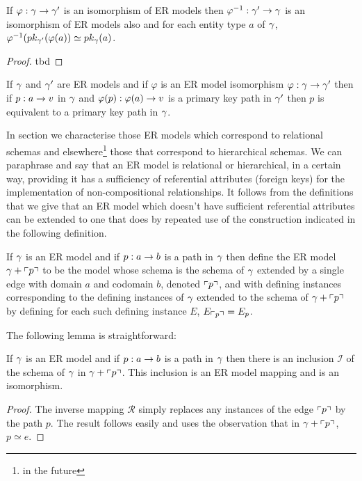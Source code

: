 \begin{lemma}
If $\varphi: \gmodel \morph \gmodel'$ is an isomorphism of ER models then
$\varphi^{-1}: \gmodel' \morph \gmodel$ is an isomorphism of ER models also and
for each entity type $a$ of $\gmodel$, $\varphi^{-1}(\pk[\gmodel']{\varphi(a)}\simeq\pk{a}$.
\end{lemma}
\begin{proof}
tbd
\end{proof}

\begin{lemma}
If $\gmodel$ and $\gmodel'$ are ER models and if $\varphi$ is an ER model isomorphism $\varphi: \gmodel \morph \gmodel'$ then if $p:a \morph \veee$ in $\gmodel$ and $\varphi(p) :\varphi(a) \morph \veee$ is a primary key path in $\gmodel'$ then $p$ is equivalent to a primary key path in $\gmodel$.
\end{lemma}

In section  we characterise those ER models which correspond to relational schemas and elsewhere\footnote{in the future} those that correspond to hierarchical schemas. 
We can paraphrase and say that an ER model is relational or hierarchical, in a certain way,  providing it has a sufficiency of referential attributes (foreign keys) for the implementation  of non-compositional relationships. It follows from the definitions that we give that an ER model which doesn't have sufficient 
referential attributes can be extended to one that does by repeated use of the construction indicated in the following definition.
\begin{definition}
If $\gmodel$ is an ER model and if $p:a \morph b$ is a path in $\gmodel$ then define the ER model $\gmodel + \qq{p}$ to be the model whose schema is the schema of $\gmodel$ extended by a single edge with domain $a$ and codomain $b$, denoted $\qq{p}$, and with defining instances corresponding to the defining instances of $\gmodel$ extended to the schema of $\gmodel + \qq{p}$ by defining for each such defining instance $E$, $E_{\qq{p}}=E_p$.
\end{definition} 


The following lemma is straightforward:
\begin{lemma}
If $\gmodel$ is an ER model and if $p:a \morph b$ is a path in $\gmodel$ then
there is an inclusion  $\mathcal{I}$ of the schema of $\gmodel$ in $\gmodel + \qq{p}$. This inclusion is an ER model mapping and is an isomorphism. 
\end{lemma}
\begin{proof}
The inverse mapping $\mathcal{R}$ simply replaces any instances of the edge $\qq{p}$ by the path $p$. The result follows easily and uses the observation that in $\gmodel + \qq{p}$, $p \simeq e$.
\end{proof}


